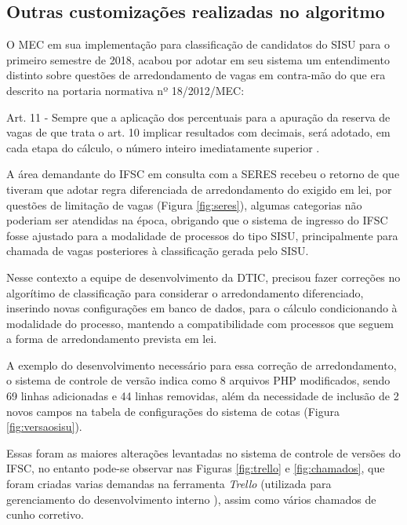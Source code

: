 \subsection{Outras customizações realizadas no algoritmo}
\label{outrasVersoes}

O \gls{MEC} em sua implementação para classificação de candidatos do \gls{SISU} para o primeiro semestre de 2018, acabou por adotar em seu sistema um entendimento distinto sobre questões de arredondamento de vagas em contra-mão do que era descrito na portaria normativa nº 18/2012/MEC:

\begin{citacao}
Art. 11 - Sempre que a aplicação dos percentuais para a apuração da reserva de vagas de que trata o art. 10 implicar resultados com decimais, será adotado, em cada etapa do cálculo, o número inteiro imediatamente superior \cite{portarianr9}.
\end{citacao}



A área demandante do \gls{IFSC} em consulta com a \gls{SERES} recebeu o retorno de que tiveram que adotar regra diferenciada de arredondamento do exigido em lei, por questões de limitação de vagas (Figura \ref{fig:seres}), algumas categorias não poderiam ser atendidas na época, obrigando que o sistema de ingresso do \gls{IFSC} fosse ajustado para a modalidade de processos do tipo \gls{SISU}, principalmente para chamada de vagas posteriores à classificação gerada pelo \gls{SISU}.

Nesse contexto a equipe de desenvolvimento da \gls{DTIC}, precisou fazer correções no algorítimo de classificação para considerar o arredondamento diferenciado, inserindo novas configurações em banco de dados, para o cálculo condicionando à modalidade do processo, mantendo a compatibilidade com processos que seguem a forma de arredondamento prevista em lei.

A exemplo do desenvolvimento necessário para essa correção de arredondamento, o sistema de controle de versão indica como 8 arquivos PHP modificados, sendo 69 linhas adicionadas e 44 linhas removidas, além da necessidade de inclusão de 2 novos campos na tabela de configurações do sistema de cotas (Figura \ref{fig:versaosisu}).



Essas foram as maiores alterações levantadas no sistema de controle de versões do \gls{IFSC}, no entanto pode-se observar nas Figuras \ref{fig:trello} e \ref{fig:chamados}, que foram criadas varias demandas na ferramenta \textit{Trello} (utilizada para gerenciamento do desenvolvimento interno ), assim como vários chamados de cunho corretivo.  


